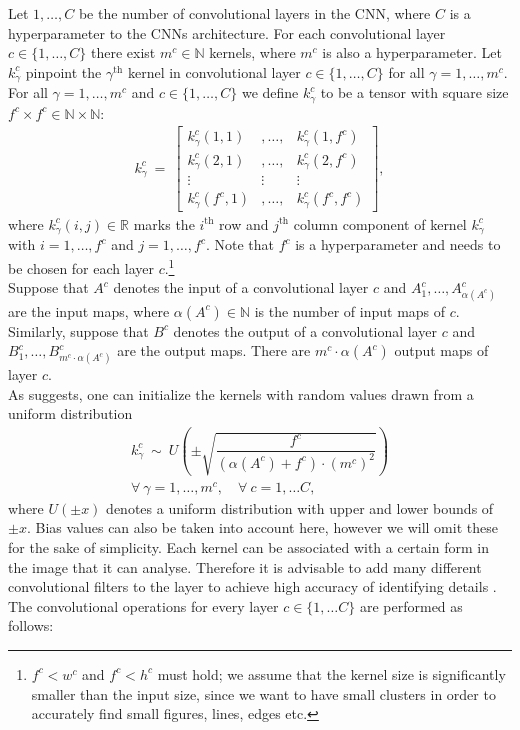\documentclass{article}
\begin{document}
Let $1, \ldots, C$ be the number of convolutional layers in the CNN, where $C$ is a hyperparameter to the CNNs architecture.
For each convolutional layer $c \in \{1, \ldots, C\}$ there exist $m^c \in \mathbb{N}$ kernels, where $m^c$ is also a hyperparameter. Let $k_\gamma^c$ pinpoint the $\gamma^{\text{th}}$ kernel in convolutional layer $c \in \{1, \ldots, C\}$ for all $\gamma = 1, \ldots, m^c$. For all $\gamma=1, \ldots, m^c$ and  $c \in \{1, \ldots, C\}$ we define $k_\gamma^c$ to be a tensor with square size $f^c \times f^c \in \mathbb{N} \times \mathbb{N}$:
\begin{align}
k_\gamma^c \ = \
\begin{bmatrix}
k_\gamma^c(1,1)&, \ldots, &k_\gamma^c(1,f^c) \\
k_\gamma^c(2,1)&, \ldots, &k_\gamma^c(2,f^c) \\ 
\vdots & \vdots &\vdots \\
k_\gamma^c(f^c,1)&, \ldots, &k_\gamma^c(f^c, f^c)
\end{bmatrix},
\end{align}
where $k_\gamma^c(i, j) \in \mathbb{R}$ marks the $i^{\text{th}}$ row and $j^{\text{th}}$ column component of kernel $k_\gamma^c$ with $i=1, \ldots, f^c$ and $j=1, \ldots, f^c$. Note that $f^c$ is a hyperparameter and needs to be chosen for each layer $c$.\footnote{$f^c < w^c$ and $f^c < h^c$ must hold; we assume that the kernel size is significantly smaller than the input size, since we want to have small clusters in order to accurately find small figures, lines, edges etc.}\\
Suppose that $A^c$ denotes the input of a convolutional layer $c$ and $A^c_1, \ldots, A^c_{\alpha(A^c)}$ are the input maps, where $\alpha(A^c) \in \mathbb{N}$ is the number of input maps of $c$.\\
Similarly, suppose that $B^c$ denotes the output of a convolutional layer $c$ and $B^c_1, \ldots, B^c_{m^c \cdot \alpha(A^c)}$ are the output maps. There are $m^c \cdot \alpha(A^c)$ output maps of layer $c$.\\
As \cite{uniform_distribut} suggests, one can initialize the kernels with random values drawn from a uniform distribution
\begin{align*}
k_\gamma^c \ \sim \ U \left( \pm \sqrt{\dfrac{f^c}{(\alpha(A^c) + f^c) \cdot (m^c)^2}} \right) \\
\forall \ \gamma=1, \ldots, m^c, \quad \forall \ c=1, \ldots C,
\end{align*}
where $U( \pm x )$ denotes a uniform distribution with upper and lower bounds of $\pm x$. Bias values can also be taken into account here, however we will omit these for the sake of simplicity. Each kernel can be associated with a certain form in the image that it can analyse. Therefore it is advisable to add many different convolutional filters to the layer to achieve high accuracy of identifying details \cite{uniform_distribut}.\\
The convolutional operations for every layer $c \in \{1, \ldots C \}$ are performed as follows:
\end{document}

